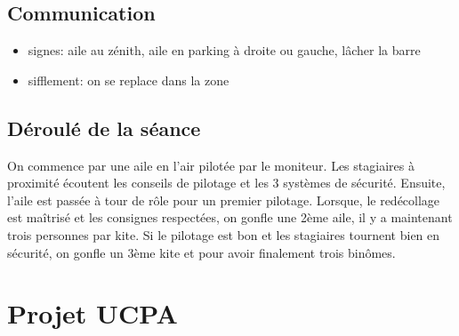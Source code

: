 \documentclass[11pt,a4paper]{report}
\begin{document}
\section{Communication}
\begin{itemize}
\item signes: aile au zénith, aile en parking à droite ou gauche, lâcher la barre
\item sifflement: on se replace dans la zone
\end{itemize}
\section{Déroulé de la séance}
On commence par une aile en l'air pilotée par le moniteur.
Les stagiaires à proximité écoutent les conseils de pilotage et les 3 systèmes
de sécurité.
Ensuite, l'aile est passée à tour de rôle pour un premier pilotage.
Lorsque, le redécollage est maîtrisé et les consignes respectées, 
on gonfle une 2ème aile, il y a maintenant trois personnes par kite.
Si le pilotage est bon et les stagiaires tournent bien en sécurité,
on gonfle un 3ème kite et pour avoir finalement trois binômes.


\chapter{Projet UCPA\label{ucpa_projet}}




\end{document}
